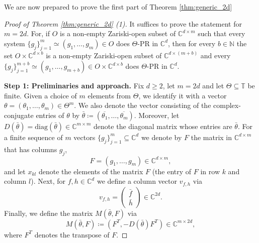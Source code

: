 \documentclass[reqno,a4paper,11pt]{amsart}
\numberwithin{equation}{section}
\def\N{{\mathbb N}}
\def\T{{\mathbb T}}
\def\C{{\mathbb C}}
\newcommand{\Cd}{{\C^d}}
\newcommand\1{\mathds{1}}
\begin{document}
We are now prepared to prove the first part of Theorem \ref{thm:generic_2d}

\begin{proof}[Proof of Theorem \ref{thm:generic_2d} (1)]

It suffices to prove the statement for $m=2d$. For, if $O$ is a non-empty Zariski-open subset of $\C^{d \times m}$ such that every system $\{ g_j \}_{j=1}^m \simeq (g_1,\dots,g_m) \in O$ does $\Theta$-PR in $\Cd$, then for every $b \in \N$ the set $O \times \C^{d \times b}$ is a non-empty Zariski-open subset of $\C^{d \times (m+b)}$ and every $\{ g_j \}_{j=1}^{m+b} \simeq (g_1,\dots,g_{m+b}) \in O \times \C^{d \times b}$ does $\Theta$-PR in $\Cd$.

\textbf{Step 1: Preliminaries and approach.}
Fix $d \geq 2$, let $m = 2d$ and let $\Theta\subseteq\T$ be finite. Given a choice of $m$ elements from $\Theta$, we identify it with a vector $\theta = (\theta_1, \dots, \theta_{m}) \in \Theta^{m}$. We also denote the vector consisting of the complex-conjugate entries of $\theta$ by $\bar{\theta} \coloneqq (\overline{\theta_1}, \dots, \overline{\theta_{m}})$. Moreover, let $D(\bar{\theta} ) = \mathrm{diag}(\bar{\theta}) \in \C^{m \times m}$ denote the diagonal matrix whose entries are $\bar{\theta}$. For a finite sequence of $m$ vectors $\{ g_j \}_{j=1}^{m} \subseteq \Cd$ we denote by $F$ the matrix in $\C^{d \times m}$ that has columns $g_j$,
$$
F = (g_1, \dots, g_{m}) \in \C^{d \times m},
$$
and let $x_{kl}$ denote the elements of the matrix $F$ (the entry of $F$ in row $k$ and column $l$). Next, for $f,h \in \Cd$ we define a column vector $v_{f,h}$ via
$$
v_{f,h} = \begin{pmatrix}
    \bar{f} \\ \bar{h}
\end{pmatrix} \in \C^{2d}.
$$
Finally, we define the matrix $M(\bar{\theta},F)$ via
$$
M(\bar{\theta},F) \coloneqq \left ( F^{T} , -D(\bar{\theta}) F^T \right ) \in \C^{m \times 2d},
$$
where $F^T$ denotes the transpose of $F$.


\end{proof}
\end{document}
